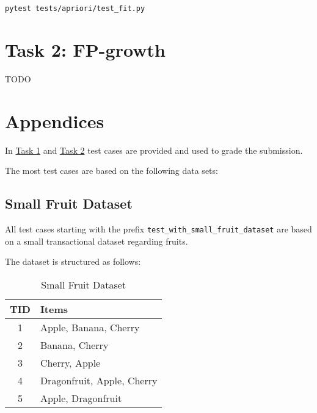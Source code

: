 \documentclass[
english,
smallborders
]{i6prcsht}
\begin{document}
\begin{lstlisting}
pytest tests/apriori/test_fit.py
\end{lstlisting}


\newpage

\section*{Task 2: FP-growth}
\label{sec:task-two}

TODO

\newpage

\section*{Appendices}

In \hyperref[sec:task-one]{Task 1} and \hyperref[sec:task-one]{Task 2} test cases are provided and used to grade the submission.

The most test cases are based on the following data sets:

\subsection*{Small Fruit Dataset}

All test cases starting with the prefix \texttt{test\_with\_small\_fruit\_dataset} are based on a small transactional dataset regarding fruits.

The dataset is structured as follows:

\vspace*{1cm}

\begin{table}[ht]
	\centering
	\begin{tabular}{|c|l|}
		\hline
		\textbf{TID} & \textbf{Items}             \\
		\hline
		1            & Apple, Banana, Cherry      \\
		\hline
		2            & Banana, Cherry             \\
		\hline
		3            & Cherry, Apple              \\
		\hline
		4            & Dragonfruit, Apple, Cherry \\
		\hline
		5            & Apple, Dragonfruit         \\
		\hline
	\end{tabular}
	\caption{Small Fruit Dataset}
	\label{tab:small-fruit-dataset}
\end{table}
\end{document}
